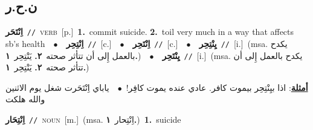 \documentclass[10pt,a4paper,twoside]{article} %
\begin{document}
\begin{multicols}{2}
\vspace{-3mm}
\subsection*{\color{blue}\foreignlanguage{arabic}{ن.ح.ر}\color{blue}{}} 

{\setlength\topsep{0pt}\textbf{\foreignlanguage{arabic}{اِنْتَحَر}}\ {\color{gray}\texttt{//}\color{black}}\ \textsc{verb}\ [p.]\ \textbf{1.}~commit suicide.  \textbf{2.}~toil very much in a way that affects sb's health\ \ $\bullet$\ \ \setlength\topsep{0pt}\textbf{\foreignlanguage{arabic}{اِنْتِحِر}}\ {\color{gray}\texttt{//}\color{black}}\ [c.]\ \ $\bullet$\ \ \setlength\topsep{0pt}\textbf{\foreignlanguage{arabic}{اِنْتَحِر}}\ {\color{gray}\texttt{//}\color{black}}\ [c.]\ \ $\bullet$\ \ \setlength\topsep{0pt}\textbf{\foreignlanguage{arabic}{يِنْتِحِر}}\ {\color{gray}\texttt{//}\color{black}}\ [i.]\ \color{gray}(msa. \foreignlanguage{arabic}{يكدح بالعمل إِلى أن تتأثر صحته}~\foreignlanguage{arabic}{\textbf{٢.}}  \foreignlanguage{arabic}{يَنْتِحِر}~\foreignlanguage{arabic}{\textbf{١.}})\color{black}\ \ $\bullet$\ \ \setlength\topsep{0pt}\textbf{\foreignlanguage{arabic}{يِنْتَحِر}}\ {\color{gray}\texttt{//}\color{black}}\ [i.]\ \color{gray}(msa. \foreignlanguage{arabic}{يكدح بالعمل إِلى أن تتأثر صحته}~\foreignlanguage{arabic}{\textbf{٢.}}  \foreignlanguage{arabic}{يَنْتِحِر}~\foreignlanguage{arabic}{\textbf{١.}})\color{black}\  \begin{flushright}\color{gray}\foreignlanguage{arabic}{\textbf{\underline{\foreignlanguage{arabic}{أمثلة}}}: اذا بيِنْتِحِر بيموت كافر. عادي عنده يموت كافِر!\ $\bullet$\ \  ياباي اِنْتَحَرت شغل يوم الاثنين والله هلكت}\end{flushright}\color{black}} \vspace{2mm}

{\setlength\topsep{0pt}\textbf{\foreignlanguage{arabic}{اِنْتِحَار}}\ {\color{gray}\texttt{//}\color{black}}\ \textsc{noun}\ [m.]\ \color{gray}(msa. \foreignlanguage{arabic}{اِنْتِحار}~\foreignlanguage{arabic}{\textbf{١.}})\color{black}\ \textbf{1.}~suicide\ } \vspace{2mm}


\end{multicols}
\end{document}
